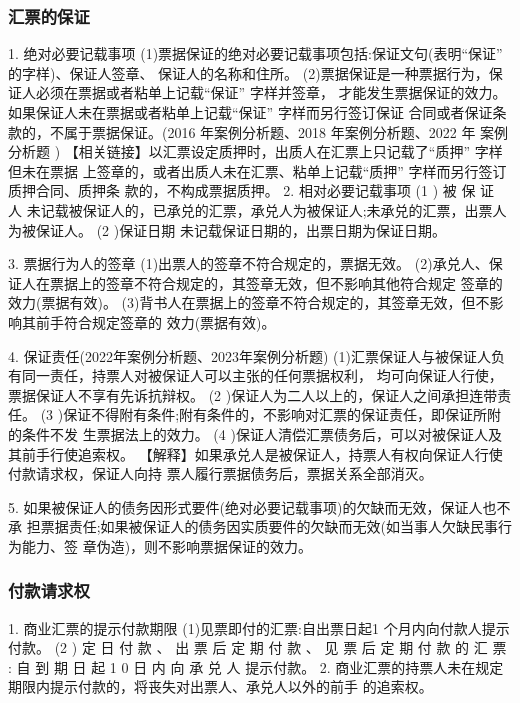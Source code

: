 \documentclass[UTF8,12pt]{ctexart}
\numberwithin{equation}{section} %
\numberwithin{figure}{section}
\numberwithin{table}{section}
\begin{document}
	
	
	\subsubsection{汇票的保证} 
	1. 绝对必要记载事项
	(1)票据保证的绝对必要记载事项包括:保证文句(表明“保证” 的字样)、保证人签章、 保证人的名称和住所。 (2)票据保证是一种票据行为，保证人必须在票据或者粘单上记载“保证” 字样并签章， 才能发生票据保证的效力。如果保证人未在票据或者粘单上记载“保证” 字样而另行签订保证 合同或者保证条款的，不属于票据保证。(2016 年案例分析题、2018 年案例分析题、2022 年 案例分析题 )
	【相关链接】以汇票设定质押时，出质人在汇票上只记载了“质押” 字样但未在票据 上签章的，或者出质人未在汇票、粘单上记载“质押” 字样而另行签订质押合同、质押条 款的，不构成票据质押。
	2. 相对必要记载事项
	(1 ) 被 保 证 人 未记载被保证人的，已承兑的汇票，承兑人为被保证人;未承兑的汇票，出票人为被保证人。 (2 )保证日期
	未记载保证日期的，出票日期为保证日期。
	
	 3. 票据行为人的签章
	 (1)出票人的签章不符合规定的，票据无效。 (2)承兑人、保证人在票据上的签章不符合规定的，其签章无效，但不影响其他符合规定 签章的效力(票据有效)。 (3)背书人在票据上的签章不符合规定的，其签章无效，但不影响其前手符合规定签章的 效力(票据有效)。
	 
	 4. 保证责任(2022年案例分析题、2023年案例分析题) (1)汇票保证人与被保证人负有同一责任，持票人对被保证人可以主张的任何票据权利， 均可向保证人行使，票据保证人不享有先诉抗辩权。
	 (2 )保证人为二人以上的，保证人之间承担连带责任。
	 (3 )保证不得附有条件;附有条件的，不影响对汇票的保证责任，即保证所附的条件不发 生票据法上的效力。
	 (4 )保证人清偿汇票债务后，可以对被保证人及其前手行使追索权。 【解释】如果承兑人是被保证人，持票人有权向保证人行使付款请求权，保证人向持 票人履行票据债务后，票据关系全部消灭。
	 
	 5. 如果被保证人的债务因形式要件(绝对必要记载事项)的欠缺而无效，保证人也不承 担票据责任;如果被保证人的债务因实质要件的欠缺而无效(如当事人欠缺民事行为能力、签 章伪造)，则不影响票据保证的效力。
	 
	 
	
	\subsubsection{付款请求权} 
	1. 商业汇票的提示付款期限
	(1)见票即付的汇票:自出票日起1 个月内向付款人提示付款。
	(2 ) 定 日 付 款 、 出 票 后 定 期 付 款 、 见 票 后 定 期 付 款 的 汇 票 : 自 到 期 日 起 1 0 日 内 向 承 兑 人 提示付款。
	2. 商业汇票的持票人未在规定期限内提示付款的，将丧失对出票人、承兑人以外的前手 的追索权。
	
\end{document}
